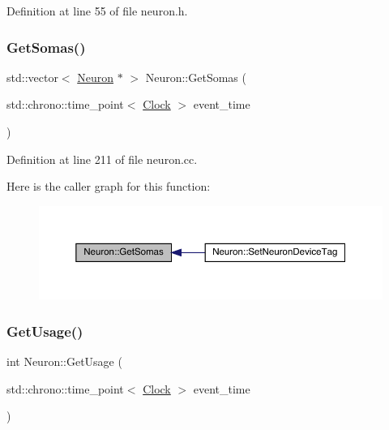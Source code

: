 Definition at line 55 of file neuron.\+h.

\mbox{\label{class_neuron_a867fbd498b54c115a2c8769f83c48020}} 
\subsubsection{\texorpdfstring{Get\+Somas()}{GetSomas()}}
{\footnotesize\ttfamily std\+::vector$<$ \hyperlink{class_neuron}{Neuron} $\ast$ $>$ Neuron\+::\+Get\+Somas (\begin{DoxyParamCaption}\item[{std\+::chrono\+::time\+\_\+point$<$ \hyperlink{universe_8h_a0ef8d951d1ca5ab3cfaf7ab4c7a6fd80}{Clock} $>$}]{event\+\_\+time }\end{DoxyParamCaption})}



Definition at line 211 of file neuron.\+cc.

Here is the caller graph for this function\+:
\nopagebreak
\begin{figure}[H]
\begin{center}
\leavevmode
\includegraphics[width=350pt]{class_neuron_a867fbd498b54c115a2c8769f83c48020_icgraph}
\end{center}
\end{figure}
\mbox{\label{class_neuron_a745b090da1b8f8fc7e3cf0ca06dfb117}} 
\subsubsection{\texorpdfstring{Get\+Usage()}{GetUsage()}}
{\footnotesize\ttfamily int Neuron\+::\+Get\+Usage (\begin{DoxyParamCaption}\item[{std\+::chrono\+::time\+\_\+point$<$ \hyperlink{universe_8h_a0ef8d951d1ca5ab3cfaf7ab4c7a6fd80}{Clock} $>$}]{event\+\_\+time }\end{DoxyParamCaption})\hspace{0.3cm}{\ttfamily [inline]}}



